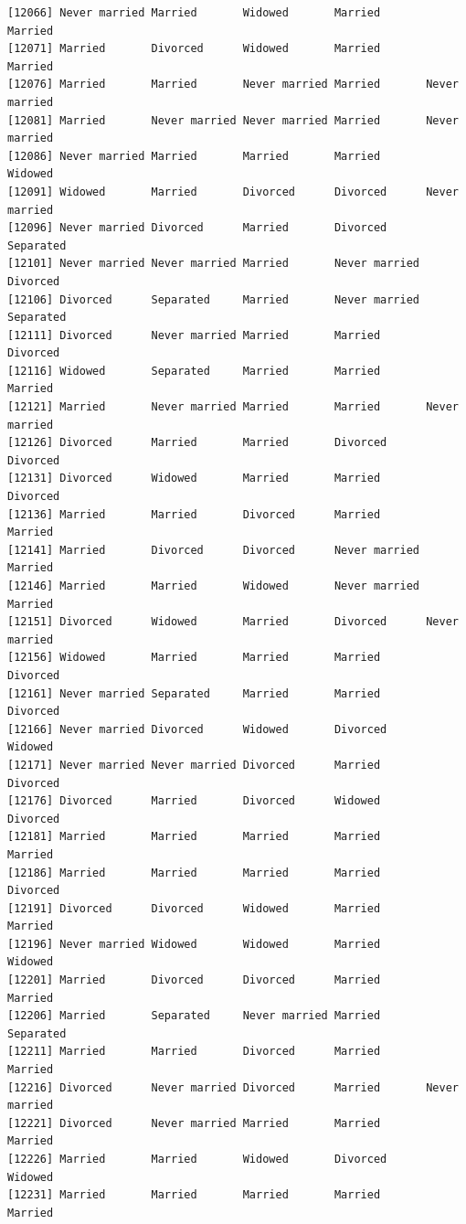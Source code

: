 \documentclass[
  letterpaper,
  DIV=11,
  numbers=noendperiod,
  oneside]{scrartcl}
\begin{document}
\begin{verbatim}
[12066] Never married Married       Widowed       Married       Married      
[12071] Married       Divorced      Widowed       Married       Married      
[12076] Married       Married       Never married Married       Never married
[12081] Married       Never married Never married Married       Never married
[12086] Never married Married       Married       Married       Widowed      
[12091] Widowed       Married       Divorced      Divorced      Never married
[12096] Never married Divorced      Married       Divorced      Separated    
[12101] Never married Never married Married       Never married Divorced     
[12106] Divorced      Separated     Married       Never married Separated    
[12111] Divorced      Never married Married       Married       Divorced     
[12116] Widowed       Separated     Married       Married       Married      
[12121] Married       Never married Married       Married       Never married
[12126] Divorced      Married       Married       Divorced      Divorced     
[12131] Divorced      Widowed       Married       Married       Divorced     
[12136] Married       Married       Divorced      Married       Married      
[12141] Married       Divorced      Divorced      Never married Married      
[12146] Married       Married       Widowed       Never married Married      
[12151] Divorced      Widowed       Married       Divorced      Never married
[12156] Widowed       Married       Married       Married       Divorced     
[12161] Never married Separated     Married       Married       Divorced     
[12166] Never married Divorced      Widowed       Divorced      Widowed      
[12171] Never married Never married Divorced      Married       Divorced     
[12176] Divorced      Married       Divorced      Widowed       Divorced     
[12181] Married       Married       Married       Married       Married      
[12186] Married       Married       Married       Married       Divorced     
[12191] Divorced      Divorced      Widowed       Married       Married      
[12196] Never married Widowed       Widowed       Married       Widowed      
[12201] Married       Divorced      Divorced      Married       Married      
[12206] Married       Separated     Never married Married       Separated    
[12211] Married       Married       Divorced      Married       Married      
[12216] Divorced      Never married Divorced      Married       Never married
[12221] Divorced      Never married Married       Married       Married      
[12226] Married       Married       Widowed       Divorced      Widowed      
[12231] Married       Married       Married       Married       Married      

\end{verbatim}
\end{document}
